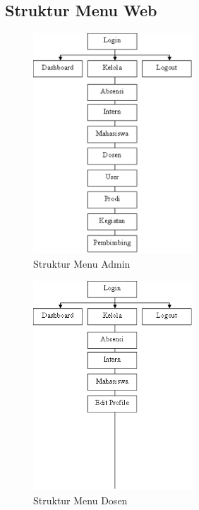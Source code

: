 \subsection{Struktur Menu Web}
	\begin{figure}[H]
		\includegraphics[width=6cm]{figures/diagram/image107.png}
		\centering
		\caption{Struktur Menu Admin }
	\end{figure}
		\begin{figure}[H]
		\includegraphics[width=6cm]{figures/diagram/image108.png}
		\centering
		\caption{Struktur Menu Dosen }
	\end{figure}

